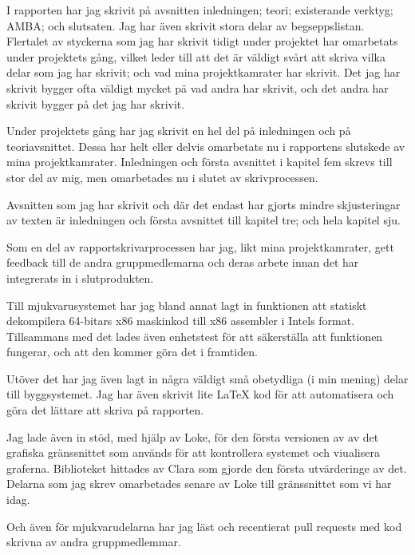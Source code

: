 I rapporten har jag skrivit på avsnitten inledningen; teori; existerande
verktyg; AMBA; och slutsaten. Jag har även skrivit stora delar av
begseppslistan. Flertalet av styckerna som jag har skrivit tidigt under
projektet har omarbetats under projektets gång, vilket leder till att det
är väldigt svårt att skriva vilka delar som jag har skrivit; och vad mina
projektkamrater har skrivit. Det jag har skrivit bygger ofta väldigt mycket pä
vad andra har skrivit, och det andra har skrivit bygger på det jag har skrivit.

Under projektets gång har jag skrivit en hel del på inledningen och på
teoriavsnittet. Dessa har helt eller delvis omarbetats nu i rapportens slutskede
av mina projektkamrater. Inledningen och första avsnittet i kapitel fem skrevs
till stor del av mig, men omarbetades nu i slutet av skrivprocessen.

Avsnitten som jag har skrivit och där det endast har gjorts mindre skjusteringar
av texten är inledningen och första avsnittet till kapitel tre; och hela kapitel sju.

Som en del av rapportskrivarprocessen har jag, likt mina projektkamrater,
gett feedback till de andra gruppmedlemarna och deras arbete innan det har
integrerats in i slutprodukten.

Till mjukvarusystemet har jag bland annat lagt in funktionen att statiskt
dekompilera 64-bitars x86 maskinkod till x86 assembler i Intels format.
Tillsammans med det lades även enhetstest för att säkerställa att funktionen
fungerar, och att den kommer göra det i framtiden.

Utöver det har jag även lagt in några väldigt små obetydliga (i min mening)
delar till byggsystemet. Jag har även skrivit lite \LaTeX{} kod för att
automatisera och göra det lättare att skriva på rapporten.

Jag lade även in stöd, med hjälp av Loke, för den första versionen av av det
grafiska gränssnittet som används för att kontrollera systemet och viualisera
graferna. Biblioteket hittades av Clara som gjorde den första utvärderinge av
det. Delarna som jag skrev omarbetades senare av Loke till gränssnittet som vi
har idag.

Och även för mjukvarudelarna har jag läst och recentierat pull requests med kod
skrivna av andra gruppmedlemmar.
